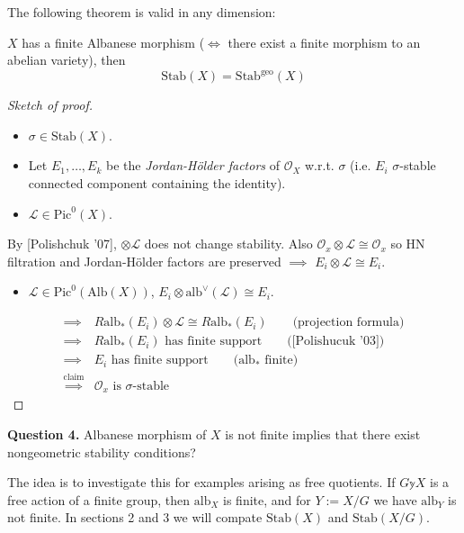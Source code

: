 \medskip\noindent
The following theorem is valid in any dimension:

\begin{theorem}
\label{theorem-Albanese-variety}
$X$ has a finite Albanese morphism ($\iff$ there exist a finite morphism to an
abelian variety), then
$$
\text{Stab}(X) = \text{Stab}^{\text{geo}}(X)
$$
\end{theorem}

\begin{proof}[Sketch of proof]
\begin{itemize}
\item $\sigma \in \text{Stab}(X)$.
\item Let $E_1,\ldots,E_k$ be the {\it Jordan-Hölder factors} of $\mathcal{O}_X$
w.r.t. $\sigma$ (i.e. $E_i$ $\sigma$-stable connected component containing the
identity).
\item $\mathcal{L} \in \text{Pic}^0(X)$.
\end{itemize}
By [Polishchuk '07], $\otimes \mathcal{L}$ does not change stability. Also
$\mathcal{O}_x \otimes \mathcal{L}\cong \mathcal{O}_x$ so HN filtration and
Jordan-Hölder factors are preserved $\implies $ $E_i \otimes \mathcal{L} \cong
E_i$.
\begin{itemize}
\item $\mathcal{L} \in \text{Pic}^0(\text{Alb}(X))$, $E_i \otimes
\text{alb}^\vee(\mathcal{L})\cong E_i$.
\end{itemize}
\begin{align*}
\implies & R\text{alb}_*(E_i)\otimes \mathcal{L} \cong R\text{alb}_*(E_i)\qquad 
\text{(projection formula)}\\
\implies &  R\text{alb}_*(E_i)\text{ has finite support}\qquad 
\text{([Polishucuk '03])}\\
\implies &E_i\text{ has finite support}\qquad 
\text{($\text{alb}_*$ finite)}\\
\overset{\text{claim}}{\implies }&\mathcal{O}_x\text{ is $\sigma$-stable}
\end{align*}
\end{proof}

\medskip\noindent
{\bf Question 4.} Albanese morphism of $X$ is not finite implies that there
exist nongeometric stability conditions?

\medskip\noindent
The idea is to investigate this for examples arising as free quotients. If 
$G \mathbb{y} X$ is a free action of a finite group, then $\text{alb}_X$ is
finite, and for $Y:=X/G$ we have $\text{alb}_Y$ is not finite. In sections 2 and
3 we will compate $\text{Stab}(X)$ and $\text{Stab}(X/G)$.

